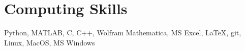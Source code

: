 \section{Computing Skills}

Python, MATLAB, C, C++, Wolfram Mathematica, MS Excel, \LaTeX, git, Linux, MacOS, MS Windows